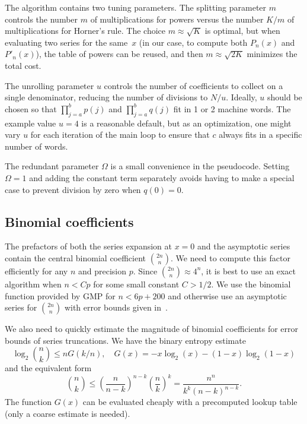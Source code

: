 \documentclass{siamart0216}
\begin{document}
The algorithm contains two tuning parameters.
The splitting parameter $m$ controls the
number $m$ of multiplications for powers versus the number $K / m$ of
multiplications for Horner's rule.
The choice $m \approx \sqrt K$ is optimal,
but when evaluating two series for the same~$x$
(in our case, to compute both $P_n(x)$ and $P'_n(x)$),
the table of powers can be reused,
and then $m \approx \sqrt{2K}$ minimizes the total cost.

The unrolling parameter $u$ controls the number of coefficients
to collect on a single denominator, reducing the
number of divisions to $N / u$.
Ideally, $u$ should be chosen
so that $\prod_{j=a}^b p(j)$
and $\prod_{j=a}^b q(j)$ fit in 1 or 2 machine words.
The example value $u = 4$ is a reasonable
default, but as an optimization, one might vary $u$
for each iteration of the main loop
to ensure that $c$ always fits in a specific number of words.

The redundant parameter $\Omega$ is a small convenience in the pseudocode.
Setting $\Omega = 1$ and adding the constant term separately
avoids having to make a special case to prevent division by zero
when $q(0) = 0$.

\subsection{Binomial coefficients}

The prefactors of both the series expansion at $x = 0$ and the asymptotic series
contain the central binomial coefficient ${2n \choose n}$.
We need to compute this factor efficiently for any $n$ and precision $p$.
Since ${2n \choose n} \approx 4^n$, it is best to use
an exact algorithm when $n < Cp$ for some small constant $C > 1/2$.
We use the binomial function provided by GMP for $n < 6p + 200$
and otherwise use an asymptotic series for ${2n \choose n}$
with error bounds given in~\cite{brent2016asymptotic}.

We also need to quickly estimate the magnitude of binomial coefficients
for error bounds of series truncations.
We have the binary entropy estimate
$$\log_2 {n \choose k} \le n G(k/n), \quad G(x) = -x \log_2(x) - (1-x) \log_2(1-x)$$
and the equivalent form
\begin{equation}
\label{eq:binbound}
{n \choose k} \le \left(\frac{n}{n-k}\right)^{n-k} \left(\frac{n}{k}\right)^k = \frac{n^n}{k^k (n-k)^{n-k}}.
\end{equation}
The function $G(x)$ can be evaluated cheaply with a precomputed
lookup table (only a coarse estimate is needed).
\end{document}
